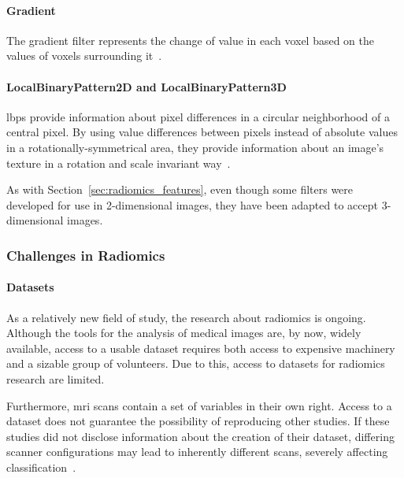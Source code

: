 \paragraph{Gradient} The gradient filter represents the change of value in each
voxel based on the values of voxels surrounding it~\cite{py_rad_docs,simpleitk_docs,simpleitk_r,simpleitk_notebooks,design_of_simpleitk}.

\paragraph{LocalBinaryPattern2D and LocalBinaryPattern3D} \acp{lbp}
provide information about pixel differences in a circular neighborhood of a central pixel. By using
value differences between pixels instead of absolute values in a 
rotationally-symmetrical area, they provide information about an image's texture
in a rotation and scale invariant way~\cite{py_rad_docs,local_binary_patterns}.

As with Section~\ref{sec:radiomics_features}, even though some filters were 
developed for use in 2-dimensional images, they have been adapted to accept
3-dimensional images\cite{py_rad_docs}.

\subsubsection{Challenges in Radiomics}

\paragraph{Datasets} As a relatively new field of study, the research about 
radiomics is ongoing. Although the tools for the analysis of medical images are,
by now, widely available, access to a usable dataset requires both access to 
expensive machinery and a sizable group of volunteers. Due to this, access to 
datasets for radiomics research are limited.

Furthermore, \ac{mri} scans contain a set of variables in their own right. 
Access to a dataset does not guarantee the possibility of reproducing other 
studies. If these studies did not disclose information about the creation of
their dataset, differing scanner configurations may lead to inherently different
scans, severely affecting classification~\cite{radiomics_process_and_challenges}. 

